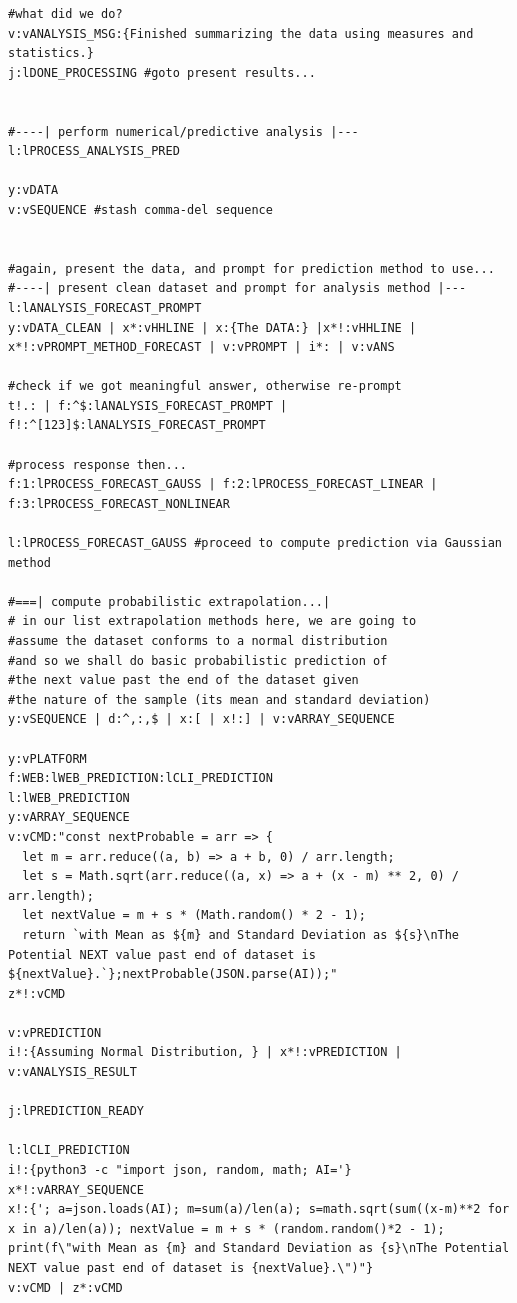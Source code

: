 \documentclass[a4paper, 18pt]{book} %
\begin{document}
{\begin{tcolorbox}[teaterminalstyle, title=TEA Program:  Statistical Analysis Tool (SAT), breakable]
\begin{lstlisting}[language=TEA,breaklines=true,]
#what did we do?
v:vANALYSIS_MSG:{Finished summarizing the data using measures and statistics.}
j:lDONE_PROCESSING #goto present results...


#----| perform numerical/predictive analysis |---
l:lPROCESS_ANALYSIS_PRED

y:vDATA
v:vSEQUENCE #stash comma-del sequence


#again, present the data, and prompt for prediction method to use...
#----| present clean dataset and prompt for analysis method |---
l:lANALYSIS_FORECAST_PROMPT
y:vDATA_CLEAN | x*:vHHLINE | x:{The DATA:} |x*!:vHHLINE | x*!:vPROMPT_METHOD_FORECAST | v:vPROMPT | i*: | v:vANS

#check if we got meaningful answer, otherwise re-prompt
t!.: | f:^$:lANALYSIS_FORECAST_PROMPT | f!:^[123]$:lANALYSIS_FORECAST_PROMPT

#process response then...
f:1:lPROCESS_FORECAST_GAUSS | f:2:lPROCESS_FORECAST_LINEAR | f:3:lPROCESS_FORECAST_NONLINEAR 

l:lPROCESS_FORECAST_GAUSS #proceed to compute prediction via Gaussian method

#===| compute probabilistic extrapolation...|
# in our list extrapolation methods here, we are going to
#assume the dataset conforms to a normal distribution
#and so we shall do basic probabilistic prediction of
#the next value past the end of the dataset given 
#the nature of the sample (its mean and standard deviation)
y:vSEQUENCE | d:^,:,$ | x:[ | x!:] | v:vARRAY_SEQUENCE

y:vPLATFORM
f:WEB:lWEB_PREDICTION:lCLI_PREDICTION
l:lWEB_PREDICTION 
y:vARRAY_SEQUENCE
v:vCMD:"const nextProbable = arr => {
  let m = arr.reduce((a, b) => a + b, 0) / arr.length;
  let s = Math.sqrt(arr.reduce((a, x) => a + (x - m) ** 2, 0) / arr.length);
  let nextValue = m + s * (Math.random() * 2 - 1);
  return `with Mean as ${m} and Standard Deviation as ${s}\nThe Potential NEXT value past end of dataset is ${nextValue}.`};nextProbable(JSON.parse(AI));"
z*!:vCMD

v:vPREDICTION
i!:{Assuming Normal Distribution, } | x*!:vPREDICTION |
v:vANALYSIS_RESULT

j:lPREDICTION_READY

l:lCLI_PREDICTION 
i!:{python3 -c "import json, random, math; AI='}
x*!:vARRAY_SEQUENCE
x!:{'; a=json.loads(AI); m=sum(a)/len(a); s=math.sqrt(sum((x-m)**2 for x in a)/len(a)); nextValue = m + s * (random.random()*2 - 1); print(f\"with Mean as {m} and Standard Deviation as {s}\nThe Potential NEXT value past end of dataset is {nextValue}.\")"}
v:vCMD | z*:vCMD


\end{lstlisting}
\end{tcolorbox}}
\end{document}
